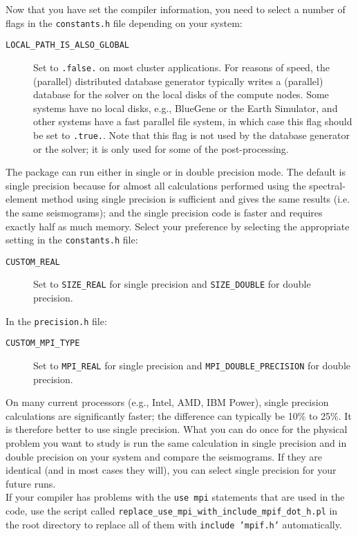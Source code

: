 Now that you have set the compiler information, you need to select
a number of flags in the \texttt{constants.h} file depending on your
system:
\begin{description}
\item [{\texttt{LOCAL\_PATH\_IS\_ALSO\_GLOBAL}}] Set to \texttt{.false.}
on most cluster applications. For reasons of speed, the (parallel)
distributed database generator typically writes a (parallel) database
for the solver on the local disks of the compute nodes. Some systems
have no local disks, e.g., BlueGene or the Earth Simulator, and other
systems have a fast parallel file system, in which case this flag
should be set to \texttt{.true.}. Note that this flag is not used
by the database generator or the solver; it is only used for some
of the post-processing.
\end{description}
%
The package can run either in single or in double precision mode.
The default is single precision because for almost all calculations
performed using the spectral-element method using single precision
is sufficient and gives the same results (i.e. the same seismograms);
and the single precision code is faster and requires exactly half
as much memory. Select your preference by selecting the appropriate
setting in the \texttt{constants.h} file:
\begin{description}
\item [{\texttt{CUSTOM\_REAL}}] Set to \texttt{SIZE\_REAL} for single precision
and \texttt{SIZE\_DOUBLE} for double precision.
\end{description}
%
In the \texttt{precision.h} file:
\begin{description}
\item [{\texttt{CUSTOM\_MPI\_TYPE}}] Set to \texttt{MPI\_REAL} for single
precision and \texttt{MPI\_DOUBLE\_PRECISION} for double precision.
\end{description}
%
On many current processors (e.g., Intel, AMD, IBM Power), single precision
calculations are significantly faster; the difference can typically
be 10\% to 25\%. It is therefore better to use single precision. What
you can do once for the physical problem you want to study is run
the same calculation in single precision and in double precision on
your system and compare the seismograms. If they are identical (and
in most cases they will), you can select single precision for your
future runs.\\

If your compiler has problems with the \texttt{use mpi} statements that are used in the code, use the script called
\texttt{replace\_use\_mpi\_with\_include\_mpif\_dot\_h.pl} in the root directory to replace all of them with \texttt{include 'mpif.h'} automatically.



